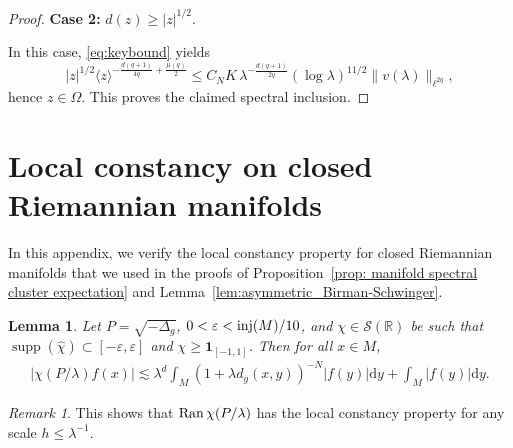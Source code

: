\documentclass[12pt,reqno]{amsart}
\newtheorem{lemma}[theorem]{Lemma}
\theoremstyle{definition}
\theoremstyle{remark}
\newtheorem{remark}[theorem]{Remark}
\numberwithin{equation}{section}
\newcommand{\1}{\mathbbm{1}}
\renewcommand{\epsilon}{\varepsilon}
\newcommand{\R}{\mathbb{R}}
\DeclareMathOperator{\supp}{supp}
\def\rd{\mathrm{d}}
\newcommand{\Ran}{\mathop{\rm Ran}}
\begin{document}
\begin{proof}
\medskip
\noindent
\textbf{Case 2:} $d(z) \ge  |z|^{1/2}$. 

In this case, \eqref{eq:keybound} yields 
\[
|z|^{1/2}\langle z\rangle^{-\frac{d(q+1)}{4q}+\frac{\mu(q)}{2}}  \leq C_NK\, \lambda^{-\frac{d(q+1)}{2q}} (\log \lambda)^{11/2} \|v(\lambda)\|_{\ell^{2q}},
\]
hence $z\in \Omega$.
This proves the claimed spectral inclusion.
\end{proof}










\appendix

\section{Local constancy on closed Riemannian manifolds}
\label{s:localconstancy}

In this appendix, we verify the local constancy property for closed Riemannian manifolds that we used in the proofs of Proposition~\ref{prop: manifold spectral cluster expectation} and Lemma~\ref{lem:asymmetric_Birman-Schwinger}.

\begin{lemma}\label{verificationlocalconstancyspectralcluster1}
 Let $P=\sqrt{-\Delta_g}$, $0<\epsilon<{\rm inj}(M)/10$, and $\chi\in\mathcal{S}(\R)$ be such that $\supp(\widehat{\chi})\subset [-\epsilon,\epsilon]$ and $\chi\geq \mathbf{1}_{[-1,1]}$. Then for all $x\in M$,
 \begin{align*}
  |\chi(P/\lambda)f(x)|\lesssim \lambda^d \int_M (1+\lambda d_g(x,y))^{-N} |f(y)|\rd y+\int_M|f(y)|\rd y.
 \end{align*}
\end{lemma}

\begin{remark}
  This shows that $\Ran \chi(P/\lambda)$ has the local constancy property for any scale $h\leq \lambda^{-1}$.
\end{remark}
\end{document}
